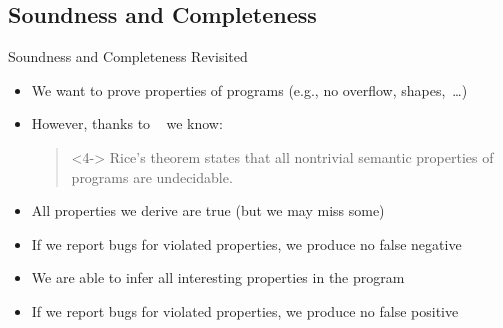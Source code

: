 \documentclass[
   aspectratio=169, %
   10pt, %
   uniqueslidenumber,
   handout,
   professionalfonts
]{beamer}
\begin{document}
\subsection{Soundness and Completeness}
\newsavebox\pinguA
\savebox\pinguA{\tikz{\pingu[wings grab,eyes sad,cup=red,wool hat]}}
\begin{frame}{Soundness and Completeness Revisited}
   \begin{itemize}
      \itemsep8pt
      \item<2-> We want to prove properties of programs (e.g., no overflow, shapes,~\ldots)
      \item<3-> However, thanks to \citeauthor{rice1953classes}~\cite{rice1953classes} we know:\smallskip\\
      \begin{quote}<4->
         Rice's theorem states that all nontrivial semantic properties of programs are undecidable.~\cite[100]{cousout2021principles}
      \end{quote}
   \end{itemize}
\vspace*{-2mm}
\begin{itemize}
   \item<7-> All properties we derive are true (but we may miss some)
   \item<7-> If we report bugs for violated properties, we produce no false negative
\end{itemize}
\bigskip

\vspace*{-2mm}
\begin{itemize}
   \item<8-> We are able to infer all interesting properties in the program
   \item<8-> If we report bugs for violated properties, we produce no false positive
\end{itemize}

\end{frame}
\end{document}
